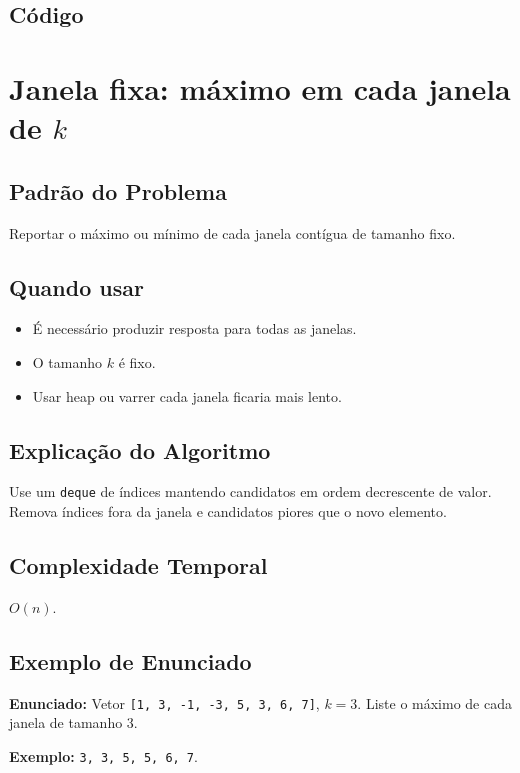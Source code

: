 \subsection{Código}

\section{Janela fixa: máximo em cada janela de $k$}

\subsection{Padrão do Problema}
Reportar o máximo ou mínimo de cada janela contígua de tamanho fixo.

\subsection{Quando usar}
\begin{itemize}[nosep]
  \item É necessário produzir resposta para todas as janelas.
  \item O tamanho $k$ é fixo.
  \item Usar heap ou varrer cada janela ficaria mais lento.
\end{itemize}

\subsection{Explicação do Algoritmo}
Use um \texttt{deque} de índices mantendo candidatos em ordem decrescente de valor. Remova índices fora da janela e candidatos piores que o novo elemento.

\subsection{Complexidade Temporal}
$O(n)$.

\subsection{Exemplo de Enunciado}
\begin{exemplodiabox}
\textbf{Enunciado:} Vetor \texttt{[1, 3, -1, -3, 5, 3, 6, 7]}, $k = 3$. Liste o máximo de cada janela de tamanho $3$.

\textbf{Exemplo:} \texttt{3, 3, 5, 5, 6, 7}.
\end{exemplodiabox}

